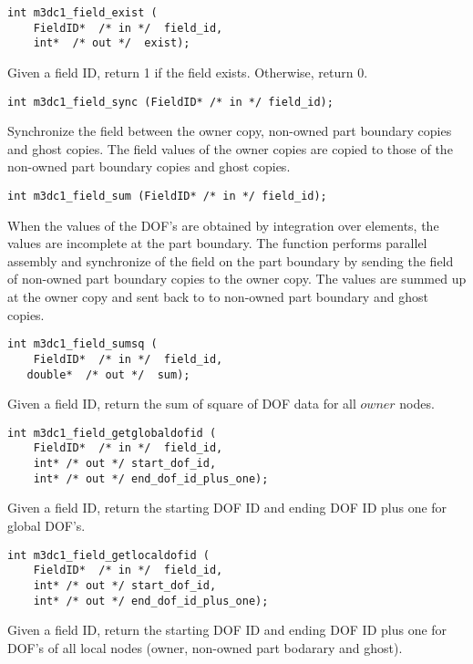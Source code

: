 \begin{verbatim}
int m3dc1_field_exist (
    FieldID*  /* in */  field_id, 
    int*  /* out */  exist);
\end{verbatim}\vspace{-.5cm}\hspace{1cm}
Given a field ID, return 1 if the field exists. Otherwise, return 0.

\begin{verbatim}
int m3dc1_field_sync (FieldID* /* in */ field_id); 
\end{verbatim}\vspace{-.5cm}\hspace{1cm}
Synchronize the field between the owner copy, non-owned part boundary copies and ghost copies. The field values of the owner copies are copied to those of the non-owned part boundary copies and ghost copies.

\begin{verbatim}
int m3dc1_field_sum (FieldID* /* in */ field_id); 
\end{verbatim}\vspace{-.5cm}\hspace{1cm}
When the values of the DOF's are obtained by integration over elements, the values are incomplete at the part boundary. The function performs parallel assembly and synchronize of the field on the part boundary by sending the field of non-owned part boundary copies to the owner copy. The values are summed up at the owner copy and sent back to to non-owned part boundary and ghost copies.  

\begin{verbatim}
int m3dc1_field_sumsq (
    FieldID*  /* in */  field_id, 
   double*  /* out */  sum);
\end{verbatim}\vspace{-.5cm}\hspace{1cm}
Given a field ID, return the sum of square of DOF data for all $owner$ nodes.

\begin{verbatim}
int m3dc1_field_getglobaldofid ( 
    FieldID*  /* in */  field_id, 
    int* /* out */ start_dof_id, 
    int* /* out */ end_dof_id_plus_one); 
\end{verbatim}\vspace{-.5cm}\hspace{1cm}
Given a field ID, return the starting DOF ID and ending DOF ID plus one for global DOF's.

\begin{verbatim}
int m3dc1_field_getlocaldofid (
    FieldID*  /* in */  field_id, 
    int* /* out */ start_dof_id, 
    int* /* out */ end_dof_id_plus_one); 
\end{verbatim}\vspace{-.5cm}\hspace{1cm}
Given a field ID, return the starting DOF ID and ending DOF ID plus one for DOF's of all local nodes (owner, non-owned part bodarary and ghost). 

